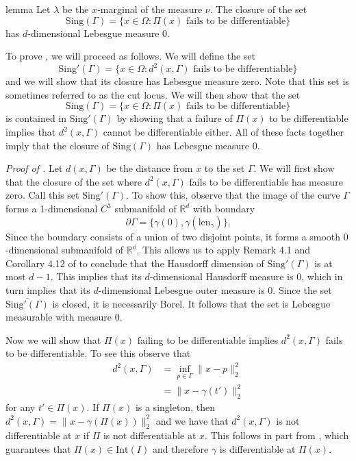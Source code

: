 \documentclass[11pt]{article}
\begin{document}
\begin{restatable}{lemma}{} \label{lemma: singular set measure}
    Let $\lambda$ be the $x$-marginal of the measure $\nu$. The closure of the set 
    \begin{equation}\text{Sing}(\Gamma) = \{x \in \Omega: \Pi(x) \text{ fails to be differentiable}\} \label{eq: singular set}
    \end{equation}
    has $d$-dimensional Lebesgue measure $0$. 
\end{restatable}
\noindent To prove , we will proceed as follows.  We will define the set 
\[\text{Sing}'(\Gamma) = \{x \in \Omega :  d^2(x, \Gamma) \text{ fails to be differentiable}\}\]
and we will show that its closure has Lebesgue measure zero. Note that this set is sometimes referred to as the cut locus. We will then show that the set 
\[\text{Sing}(\Gamma) = \{x \in \Omega :  \Pi(x) \text{ fails to be differentiable}\}\]
is contained in $\text{Sing}'(\Gamma)$ by showing that a failure of $\Pi(x)$ to be differentiable implies that $d^2(x, \Gamma)$ cannot be differentiable either. All of these facts together imply that the closure of $\text{Sing}(\Gamma)$ has Lebesgue measure $0$.

\textit{Proof of .} Let $d(x, \Gamma)$ be the distance from $x$ to the set $\Gamma$. We will first show that the closure of the set where $d^2(x,\Gamma)$ fails to be differentiable has measure zero. Call this set $\text{Sing}'(\Gamma)$. To show this, observe that the image of the curve $\Gamma$ forms a 1-dimensional $C^3$ submanifold of $\mathbb{R}^d$ with boundary
\[\partial\Gamma = \{\gamma(0), \gamma(\text{len}_{\gamma})\}.\]
Since the boundary consists of a union of two disjoint points, it forms a smooth $0$-dimensional submanifold of $\mathbb{R^d}$. This allows us to apply Remark 4.1 and Corollary 4.12 of \citet{mantegazza2002hamilton} to conclude that the Hausdorff dimension of $\overline{\text{Sing}'(\Gamma)}$ is at most $d-1$. This implies that its $d$-dimensional Hausdorff measure is $0$, which in turn implies that its $d$-dimensional Lebesgue outer measure is $0$. Since the set $\overline{\text{Sing}'(\Gamma)}$ is closed, it is necessarily Borel. It follows that the set is Lebesgue measurable with measure $0$. 

Now we will show that $\Pi(x)$ failing to be differentiable implies $d^2(x, \Gamma)$ fails to be differentiable. To see this observe that
\begin{align}
    d^2(x, \Gamma) &= \inf_{p \in \Gamma}\|x - p\|_2^2 \\ \label{eq: distance to Gamma}
    &= \|x - \gamma(t')\|_2^2
\end{align}
for any $t' \in \Pi(x)$. If $\Pi(x)$ is a singleton, then $d^2(x,\Gamma) = \|x - \gamma(\Pi(x))\|_2^2$ and we have that $d^2(x,\Gamma)$ is not differentiable at $x$ if $\Pi$ is not differentiable at $x$. This follows in part from , which guarantees that $\Pi(x) \in \text{Int}(I)$ and therefore $\gamma$ is differentiable at $\Pi(x)$.
\end{document}

